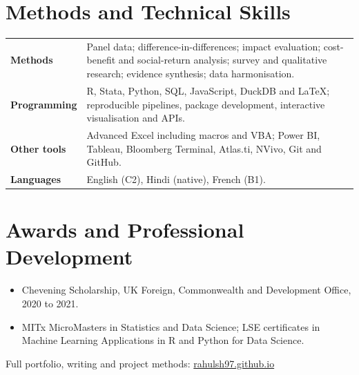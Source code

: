 \documentclass[10pt,a4paper]{article}
\begin{document}
\section*{Methods and Technical Skills}
\begin{tabularx}{\textwidth}{@{}>{\bfseries}p{2.45cm}X@{}}
Methods & Panel data; difference-in-differences; impact evaluation; cost-benefit and social-return analysis; survey and qualitative research; evidence synthesis; data harmonisation. \\
Programming & R, Stata, Python, SQL, JavaScript, DuckDB and LaTeX; reproducible pipelines, package development, interactive visualisation and APIs. \\
Other tools & Advanced Excel including macros and VBA; Power BI, Tableau, Bloomberg Terminal, Atlas.ti, NVivo, Git and GitHub. \\
Languages & English (C2), Hindi (native), French (B1). \\
\end{tabularx}

\section*{Awards and Professional Development}
\begin{itemize}
  \item Chevening Scholarship, UK Foreign, Commonwealth and Development Office, 2020 to 2021.
  \item MITx MicroMasters in Statistics and Data Science; LSE certificates in Machine Learning Applications in R and Python for Data Science.
\end{itemize}

\vfill
{\centering\sffamily\footnotesize\color{muted}
Full portfolio, writing and project methods: \href{https://rahulsh97.github.io}{rahulsh97.github.io}\par}
\end{document}
